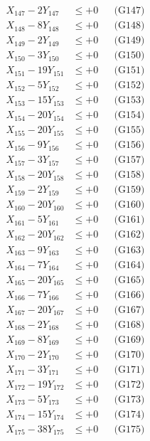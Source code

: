 \documentclass[a4paper,10pt]{article}
\begin{document}
{\begin{align}
X_{147} - 2Y_{147} &\leq +0 && \text{(G147)} \\
\allowbreak
X_{148} - 8Y_{148} &\leq +0 && \text{(G148)} \\
X_{149} - 2Y_{149} &\leq +0 && \text{(G149)} \\
X_{150} - 3Y_{150} &\leq +0 && \text{(G150)} \\
X_{151} - 19Y_{151} &\leq +0 && \text{(G151)} \\
X_{152} - 5Y_{152} &\leq +0 && \text{(G152)} \\
X_{153} - 15Y_{153} &\leq +0 && \text{(G153)} \\
X_{154} - 20Y_{154} &\leq +0 && \text{(G154)} \\
X_{155} - 20Y_{155} &\leq +0 && \text{(G155)} \\
X_{156} - 9Y_{156} &\leq +0 && \text{(G156)} \\
X_{157} - 3Y_{157} &\leq +0 && \text{(G157)} \\
\allowbreak
X_{158} - 20Y_{158} &\leq +0 && \text{(G158)} \\
X_{159} - 2Y_{159} &\leq +0 && \text{(G159)} \\
X_{160} - 20Y_{160} &\leq +0 && \text{(G160)} \\
X_{161} - 5Y_{161} &\leq +0 && \text{(G161)} \\
X_{162} - 20Y_{162} &\leq +0 && \text{(G162)} \\
X_{163} - 9Y_{163} &\leq +0 && \text{(G163)} \\
X_{164} - 7Y_{164} &\leq +0 && \text{(G164)} \\
X_{165} - 20Y_{165} &\leq +0 && \text{(G165)} \\
X_{166} - 7Y_{166} &\leq +0 && \text{(G166)} \\
X_{167} - 20Y_{167} &\leq +0 && \text{(G167)} \\
\allowbreak
X_{168} - 2Y_{168} &\leq +0 && \text{(G168)} \\
X_{169} - 8Y_{169} &\leq +0 && \text{(G169)} \\
X_{170} - 2Y_{170} &\leq +0 && \text{(G170)} \\
X_{171} - 3Y_{171} &\leq +0 && \text{(G171)} \\
X_{172} - 19Y_{172} &\leq +0 && \text{(G172)} \\
X_{173} - 5Y_{173} &\leq +0 && \text{(G173)} \\
X_{174} - 15Y_{174} &\leq +0 && \text{(G174)} \\
X_{175} - 38Y_{175} &\leq +0 && \text{(G175)} \\

\end{align}}
\end{document}

